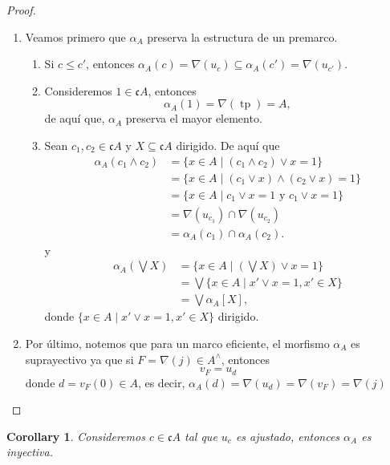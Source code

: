 \documentclass[11pt]{amsart}
\DeclareMathOperator{\tp}{tp}
\theoremstyle{plain}
\newtheorem{cor}[thm]{Corollary}
\theoremstyle{definition}
\begin{document}
\begin{proof}
    \begin{enumerate}
        \item Veamos primero que $\alpha_A$ preserva la estructura de un premarco.
    \begin{enumerate}
        \item Si $c\leq c'$,  entonces $\alpha_A(c)=\nabla(u_c)\subseteq \alpha_A(c')=\nabla(u_{c'})$.
        \item Consideremos $1\in \mathfrak{c}A$, entonces 
        \[
        \alpha_A(1)=\nabla(\tp)=A,
        \]
        de aquí que, $\alpha_A$ preserva el mayor elemento.
        \item Sean $c_1, c_2\in \mathfrak{c}A$ y $X\subseteq \mathfrak{c}A$ dirigido. De aquí que
        \[
        \begin{split}
            \alpha_A(c_1\wedge c_2)&=\{x\in A\mid (c_1\wedge c_2)\vee x=1\}\\
            &=\{x\in A\mid (c_1\vee x)\wedge (c_2\vee x)=1\}\\
            &=\{x\in A\mid c_1\vee x=1 \mbox{ y }c_1\vee x=1\}\\
            &=\nabla(u_{c_1})\cap \nabla(u_{c_2})\\
            &=\alpha_A(c_1)\cap \alpha_A(c_2).
        \end{split}
        \]
        y
        \[
        \begin{split}
        \alpha_A(\bigvee X)&=\{x\in A\mid (\bigvee X)\vee x=1\}\\
        &=\bigvee\{x\in A\mid x'\vee x=1, x'\in X\}\\
        &=\bigvee \alpha_A[X],
        \end{split}
        \]
        donde $\{x\in A\mid x'\vee x=1, x'\in X\}$ dirigido.
        \end{enumerate}
        \item Por último, notemos que para un marco eficiente, el morfismo $\alpha_A$ es suprayectivo ya que si $F=\nabla(j)\in A^\wedge$, entonces
        \[
        v_F=u_d
        \]
        donde $d=v_F(0)\in A$, es decir, $\alpha_A(d)=\nabla(u_d)=\nabla(v_F)=\nabla(j)$
    \end{enumerate}
\end{proof}

\begin{cor}
    Consideremos $c\in \mathfrak{c}A$ tal que $u_c$ es ajustado, entonces $\alpha_A$ es inyectiva. 
\end{cor}
\end{document}
